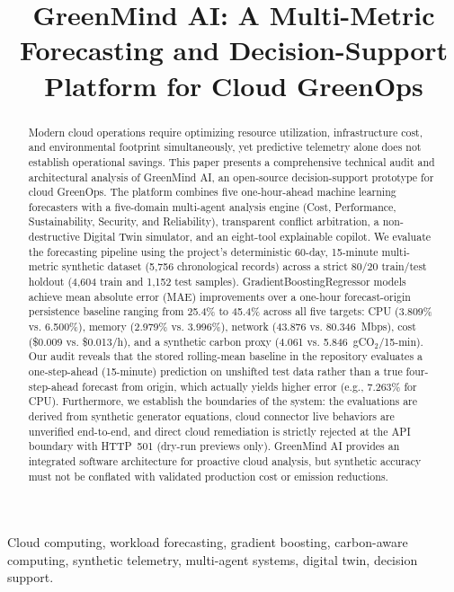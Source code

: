 \documentclass[conference]{IEEEtran}
\title{GreenMind AI: A Multi-Metric Forecasting and Decision-Support Platform for Cloud GreenOps}
\author{\IEEEauthorblockN{Anonymous submission draft}}
\begin{document}
\maketitle

\begin{abstract}
Modern cloud operations require optimizing resource utilization, infrastructure cost, and environmental footprint simultaneously, yet predictive telemetry alone does not establish operational savings. This paper presents a comprehensive technical audit and architectural analysis of GreenMind AI, an open-source decision-support prototype for cloud GreenOps. The platform combines five one-hour-ahead machine learning forecasters with a five-domain multi-agent analysis engine (Cost, Performance, Sustainability, Security, and Reliability), transparent conflict arbitration, a non-destructive Digital Twin simulator, and an eight-tool explainable copilot. We evaluate the forecasting pipeline using the project's deterministic 60-day, 15-minute multi-metric synthetic dataset (5,756 chronological records) across a strict 80/20 train/test holdout (4,604 train and 1,152 test samples). GradientBoostingRegressor models achieve mean absolute error (MAE) improvements over a one-hour forecast-origin persistence baseline ranging from 25.4\% to 45.4\% across all five targets: CPU (3.809\% vs. 6.500\%), memory (2.979\% vs. 3.996\%), network (43.876 vs. 80.346~Mbps), cost (\$0.009 vs. \$0.013/h), and a synthetic carbon proxy (4.061 vs. 5.846~gCO$_2$/15-min). Our audit reveals that the stored rolling-mean baseline in the repository evaluates a one-step-ahead (15-minute) prediction on unshifted test data rather than a true four-step-ahead forecast from origin, which actually yields higher error (e.g., 7.263\% for CPU). Furthermore, we establish the boundaries of the system: the evaluations are derived from synthetic generator equations, cloud connector live behaviors are unverified end-to-end, and direct cloud remediation is strictly rejected at the API boundary with HTTP~501 (dry-run previews only). GreenMind AI provides an integrated software architecture for proactive cloud analysis, but synthetic accuracy must not be conflated with validated production cost or emission reductions.
\end{abstract}

\begin{IEEEkeywords}
Cloud computing, workload forecasting, gradient boosting, carbon-aware computing, synthetic telemetry, multi-agent systems, digital twin, decision support.
\end{IEEEkeywords}
\end{document}
